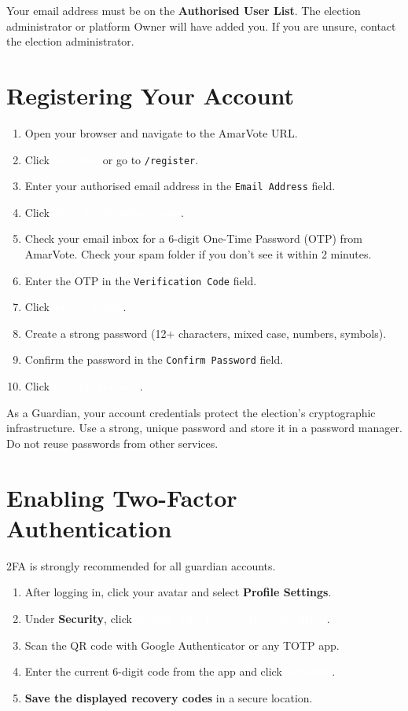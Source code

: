 \documentclass[12pt,a4paper]{book}
\newcommand{\uibutton}[1]{\colorbox{guardgreen}{\textcolor{white}{\small\textbf{#1}}}}
\newcommand{\uifield}[1]{\texttt{\color{guardaccent}#1}}
\newcommand{\uimenu}[1]{\textbf{\color{guardgreen}#1}}
\begin{document}
Your email address must be on the \textbf{Authorised User List}. The election administrator or platform Owner will have added you. If you are unsure, contact the election administrator.

\section{Registering Your Account}

\begin{enumerate}
  \item Open your browser and navigate to the AmarVote URL.
  \item Click \uibutton{Register} or go to \texttt{/register}.
  \item Enter your authorised email address in the \uifield{Email Address} field.
  \item Click \uibutton{Send Verification Code}.
  \item Check your email inbox for a 6-digit One-Time Password (OTP) from AmarVote. Check your spam folder if you don't see it within 2 minutes.
  \item Enter the OTP in the \uifield{Verification Code} field.
  \item Click \uibutton{Verify Email}.
  \item Create a strong password (12+ characters, mixed case, numbers, symbols).
  \item Confirm the password in the \uifield{Confirm Password} field.
  \item Click \uibutton{Create Account}.
\end{enumerate}

\begin{tcolorbox}[dangerbox]
As a Guardian, your account credentials protect the election's cryptographic infrastructure. Use a strong, unique password and store it in a password manager. Do not reuse passwords from other services.
\end{tcolorbox}

\section{Enabling Two-Factor Authentication}

2FA is strongly recommended for all guardian accounts.

\begin{enumerate}
  \item After logging in, click your avatar and select \uimenu{Profile Settings}.
  \item Under \uimenu{Security}, click \uibutton{Enable Two-Factor Authentication}.
  \item Scan the QR code with Google Authenticator or any TOTP app.
  \item Enter the current 6-digit code from the app and click \uibutton{Activate}.
  \item \textbf{Save the displayed recovery codes} in a secure location.
\end{enumerate}
\end{document}
